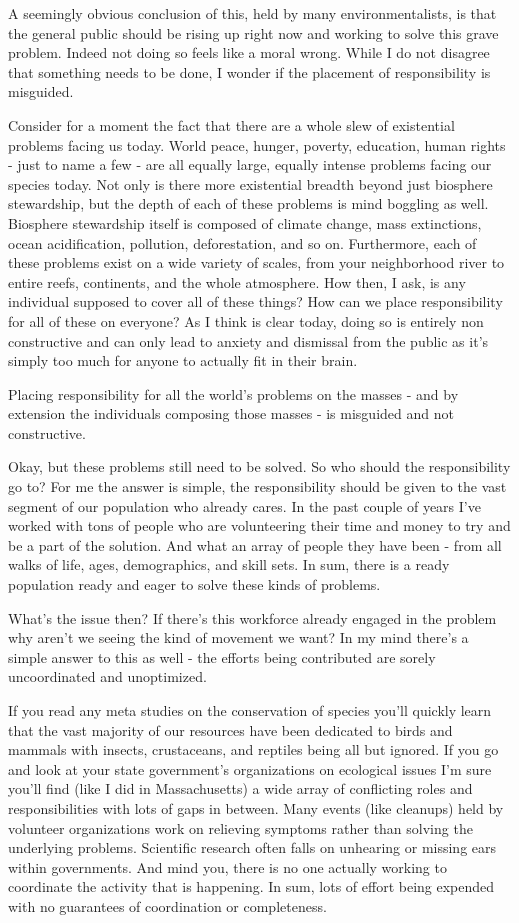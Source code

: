 \documentclass[10pt,a5paper]{book}
\begin{document}
A seemingly obvious conclusion of this, held by many environmentalists, is that the general public should be rising up right now and working to solve this grave problem. Indeed not doing so feels like a moral wrong. While I do not disagree that something needs to be done, I wonder if the placement of responsibility is misguided. 

Consider for a moment the fact that there are a whole slew of existential problems facing us today. World peace, hunger, poverty, education, human rights - just to name a few - are all equally large, equally intense problems facing our species today. Not only is there more existential breadth beyond just biosphere stewardship, but the depth of each of these problems is mind boggling as well. Biosphere stewardship itself is composed of climate change, mass extinctions, ocean acidification, pollution, deforestation, and so on. Furthermore, each of these problems exist on a wide variety of scales, from your neighborhood river to entire reefs, continents, and the whole atmosphere. How then, I ask, is any individual supposed to cover all of these things? How can we place responsibility for all of these on everyone? As I think is clear today, doing so is entirely non constructive and can only lead to anxiety and dismissal from the public as it's simply too much for anyone to actually fit in their brain.

	Placing responsibility for all the world's problems on the masses - and by extension the individuals composing those masses - is misguided and not constructive.

Okay, but these problems still need to be solved. So who should the responsibility go to? For me the answer is simple, the responsibility should be given to the vast segment of our population who already cares. In the past couple of years I've worked with tons of people who are volunteering their time and money to try and be a part of the solution. And what an array of people they have been - from all walks of life, ages, demographics, and skill sets. In sum, there is a ready population ready and eager to solve these kinds of problems.

What's the issue then? If there's this workforce already engaged in the problem why aren't we seeing the kind of movement we want? In my mind there's a simple answer to this as well - the efforts being contributed are sorely uncoordinated and unoptimized. 

If you read any meta studies on the conservation of species you'll quickly learn that the vast majority of our resources have been dedicated to birds and mammals with insects, crustaceans, and reptiles being all but ignored. If you go and look at your state government's organizations on ecological issues I'm sure you'll find (like I did in Massachusetts) a wide array of conflicting roles and responsibilities with lots of gaps in between. Many events (like cleanups) held by volunteer organizations work on relieving symptoms rather than solving the underlying problems. Scientific research often falls on unhearing or missing ears within governments. And mind you, there is no one actually working to coordinate the activity that is happening. In sum, lots of effort being expended with no guarantees of coordination or completeness. 
\end{document}
